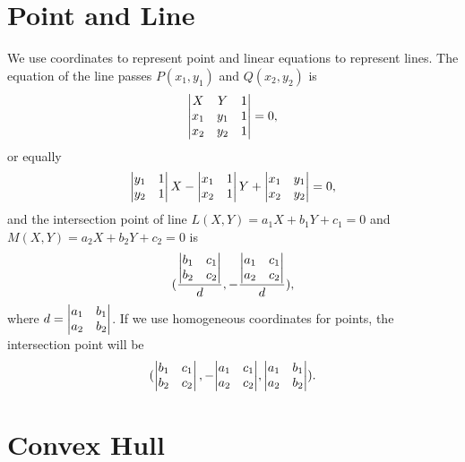 \section{Point and Line}
We use coordinates to represent point and linear equations to represent lines.
The equation of the line passes $P(x_1,y_1)$ and $Q(x_2,y_2)$ is
$$\left|\begin{matrix}X&Y&1\cr x_1&y_1&1\cr x_2&y_2&1\end{matrix}\right|=0,$$
or equally
$$\left|\begin{matrix}y_1&1\cr y_2&1\end{matrix}\right|X
-\left|\begin{matrix}x_1&1\cr x_2&1\end{matrix}\right|Y
+\left|\begin{matrix}x_1&y_1\cr x_2&y_2\end{matrix}\right|=0,$$
and the intersection point of line $L(X,Y)=a_1X + b_1Y + c_1=0$ and $M(X,Y)=a_2X + b_2Y + c_2=0$ is
$$({{\left|\begin{matrix}b_1&c_1\cr b_2&c_2\end{matrix}\right|}\over d},
-{{\left|\begin{matrix}a_1&c_1\cr a_2&c_2\end{matrix}\right|}\over d}),$$
where $d=\left|\begin{matrix}a_1&b_1\cr a_2&b_2\end{matrix}\right|$.
If we use homogeneous coordinates for points, 
the intersection point will be 
$$(\left|\begin{matrix}b_1&c_1\cr b_2&c_2\end{matrix}\right|,
-{\left|\begin{matrix}a_1&c_1\cr a_2&c_2\end{matrix}\right|},
\left|\begin{matrix}a_1&b_1\cr a_2&b_2\end{matrix}\right|).$$

\section{Convex Hull}
